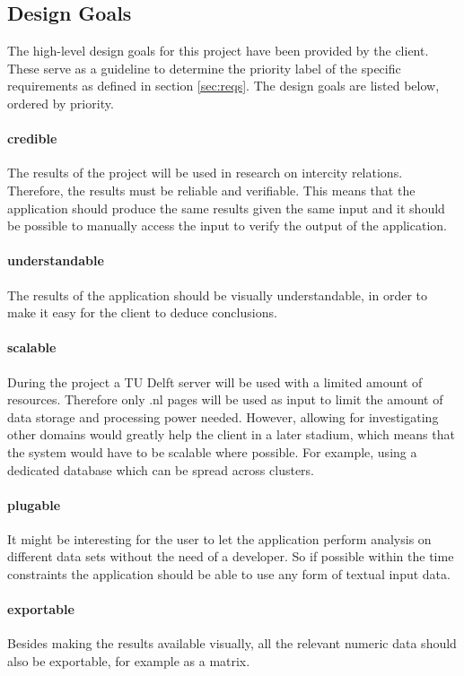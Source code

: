 \subsection{Design Goals} \label{sec:design-goals}
The high-level design goals for this project have been provided by the client. These serve as a guideline to determine the priority label of the specific requirements as defined in section \ref{sec:reqs}. The design goals are listed below, ordered by priority.

\paragraph{credible} The results of the project will be used in research on intercity relations. Therefore, the results must be reliable and verifiable. This means that the application should produce the same results given the same input and it should be possible to manually access the input to verify the output of the application.
\paragraph{understandable} The results of the application should be visually understandable, in order to make it easy for the client to deduce conclusions. 
\paragraph{scalable} During the project a TU Delft server will be used with a limited amount of resources. Therefore only .nl pages will be used as input to limit the amount of data storage and processing power needed. However, allowing for investigating other domains would greatly help the client in a later stadium, which means that the system would have to be scalable where possible. For example, using a dedicated database which can be spread across clusters.
\paragraph{plugable} It might be interesting for the user to let the application perform analysis on different data sets without the need of a developer. So if possible within the time constraints the application should be able to use any form of textual input data.
\paragraph{exportable} Besides making the results available visually, all the relevant numeric data should also be exportable, for example as a matrix.
